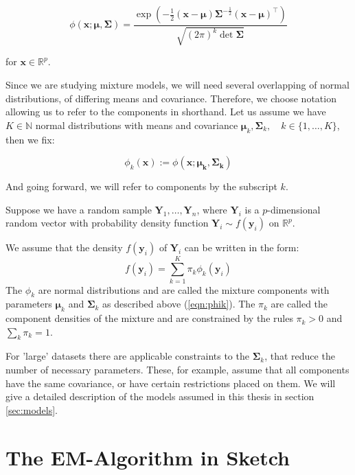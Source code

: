 \begin{equation} 
    \phi(\pmb{x;\mu,\Sigma})=
    \frac{\exp(-\frac{1}{2}(\pmb{x-\mu})\pmb{\Sigma}^{-\frac{1}{2}}(\pmb{x-\mu})^\top)}
         {\sqrt{(2\pi)^k \det{\pmb{\Sigma}}}}  
\end{equation}

for $\pmb{x} \in \mathbb{R}^p$.

Since we are studying mixture models, we will need several overlapping of 
normal distributions, of differing means and covariance. Therefore, we choose
notation allowing us to refer to the components in shorthand. Let us assume we
have $K \in \mathbb{N}$ normal distributions with means and covariance 
$\pmb{\mu}_k, \pmb{\Sigma}_k,\quad k \in \{1, \dots , K\}$, then we fix:

\begin{equation} 
    \phi_k(\pmb{x}) := \phi(\pmb{x;\mu_k, \Sigma_k})
    \label{eqn:phik}
\end{equation}

And going forward, we will refer to components by the subscript $k$.

\begin{definition}
    Suppose we have a random sample $ \pmb{Y}_1, \dots , \pmb{Y}_n $, where
    $\pmb{Y}_i$ is a $p$-dimensional random vector with probability density 
    function $ \pmb{Y}_i \sim f(\pmb{y}_i) $ on $\mathbb{R}^p$.

    We assume that the density $ f(\pmb{y}_i) $ of $ \pmb{Y}_i $ can 
    be written in the form: 
    \begin{equation} 
        f(\pmb{y}_i) = \sum_{k=1}^{K} \pi_k \phi_k (\pmb{y}_i)
        \label{eqn:mixture}
    \end{equation}
    The $\phi_k$ are normal distributions and are called the mixture components
    with parameters $\pmb{\mu}_k$ and $\pmb{\Sigma}_k$ as described above 
    (\ref{eqn:phik}).
    The $ \pi_k $ are called the component densities of the mixture and are
    constrained by the rules $\pi_k > 0$ and $\sum_k \pi_k = 1$.
\end{definition}

For 'large' datasets there are applicable constraints to the $\pmb{\Sigma}_k$, 
that reduce the number of necessary parameters. These, for example, assume that 
all components have the same covariance, or have certain restrictions placed on 
them. We will give a detailed description of the models assumed in this thesis 
in section \ref{sec:models}.


\section{The EM-Algorithm in Sketch}
\label{sec:sketch}

